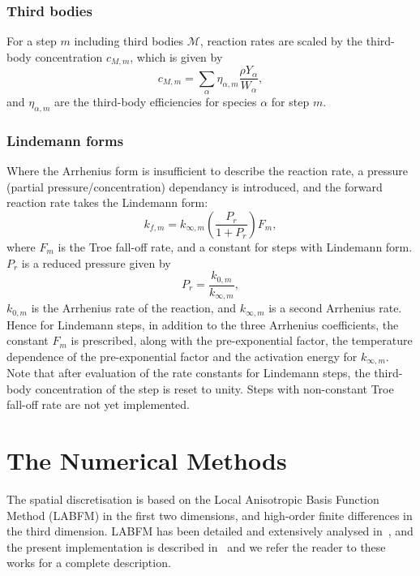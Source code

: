 \documentclass[notitlepage]{revtex4-1}
\begin{document}
\subsubsection{Third bodies}

For a step $m$ including third bodies $\mathcal{M}$, reaction rates are scaled by the third-body concentration $c_{M,m}$, which is given by
\begin{equation}c_{M,m}=\displaystyle\sum_{\alpha}\eta_{\alpha,m}\frac{\rho{Y}_{\alpha}}{W_{\alpha}},\end{equation}
and $\eta_{\alpha,m}$ are the third-body efficiencies for species $\alpha$ for step $m$.

\subsubsection{Lindemann forms}

Where the Arrhenius form is insufficient to describe the reaction rate, a pressure (partial pressure/concentration) dependancy is introduced, and the forward reaction rate takes the Lindemann form:
\begin{equation}k_{f,m}=k_{\infty,m}\left(\frac{P_{r}}{1+P_{r}}\right)F_{m},\end{equation}
where $F_{m}$ is the Troe fall-off rate, and a constant for steps with Lindemann form. $P_{r}$ is a reduced pressure given by
\begin{equation}P_{r}=\frac{k_{0,m}}{k_{\infty,m}},\end{equation}
$k_{0,m}$ is the Arrhenius rate of the reaction, and $k_{\infty,m}$ is a second Arrhenius rate. Hence for Lindemann steps, in addition to the three Arrhenius coefficients, the constant $F_{m}$ is prescribed, along with the pre-exponential factor, the temperature dependence of the pre-exponential factor and the activation energy for $k_{\infty,m}$. Note that after evaluation of the rate constants for Lindemann steps, the third-body concentration of the step is reset to unity. Steps with non-constant Troe fall-off rate are not yet implemented.

\section{The Numerical Methods}\label{ni}

The spatial discretisation is based on the Local Anisotropic Basis Function Method (LABFM) in the first two dimensions, and high-order finite differences in the third dimension. LABFM has been detailed and extensively analysed in~\cite{king_2020,king_2022}, and the present implementation is described in~\cite{king_2024} and we refer the reader to these works for a complete description.
\end{document}
